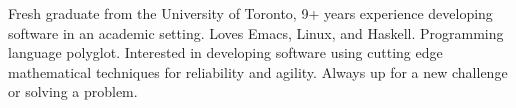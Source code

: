 

\begin{cvparagraph}

  Fresh graduate from the University of Toronto, 9+ years experience developing
  software in an academic setting. Loves Emacs, Linux, and Haskell. Programming
  language polyglot. Interested in developing software using cutting edge
  mathematical techniques for reliability and agility. Always up for a new
  challenge or solving a problem.
\end{cvparagraph}
